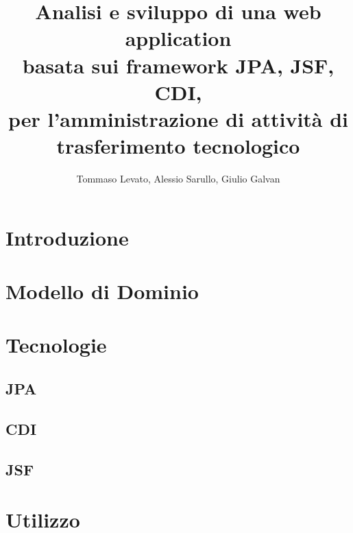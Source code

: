 \documentclass[a4paper,10pt]{report}
\title{Analisi e sviluppo di una web application \\
basata sui framework JPA, JSF, CDI, \\
per l'amministrazione di attività di trasferimento tecnologico}
\author{Tommaso Levato, Alessio Sarullo, Giulio Galvan}
\begin{document}
\maketitle


\begin{abstract}
\end{abstract}

\tableofcontents

\chapter{Introduzione}

\chapter{Modello di Dominio}
\chapter{Tecnologie}
\section{JPA}
\section{CDI}
\section{JSF}
\chapter{Utilizzo}
\end{document}
